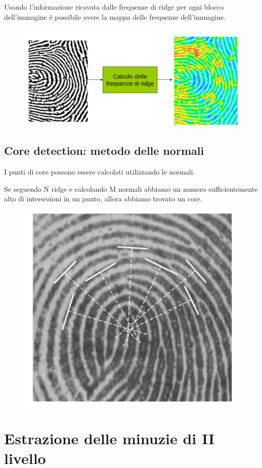 Usando l’informazione ricavata dalle frequenze di
ridge per ogni blocco dell’immagine è possibile
avere la mappa delle frequenze dell’immagine.

\begin{figure}[ht]
    \centering
    \includegraphics[width=1\linewidth]{chapters/images-chap6/spazio-freq.png}
\end{figure}

\subsection{Core detection: metodo delle normali}

I punti di core possono essere calcolati utilizzando le normali.

\noindent Se seguendo N ridge e calcolando M normali abbiamo un numero sufficientemente
alto di intersezioni in un punto, allora abbiamo trovato un core.

\begin{figure}[ht]
    \centering
    \includegraphics[width=0.5\linewidth]{chapters/images-chap6/core-detection.png}
\end{figure}

\section{Estrazione delle minuzie di II livello}

